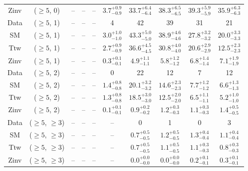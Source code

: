 \begin{table}[h!]
{\begin{tabular}{cccccccccc}
	Zinv & ($\ge5$, 0) & -- & -- & -- & $3.7^{+ 0.9 }_{- 0.9 }$ & $33.7^{+ 6.4 }_{- 6.4 }$ & $38.3^{+ 6.5 }_{- 6.5 }$ & $39.3^{+ 5.9 }_{- 5.9 }$ & $35.9^{+ 6.3 }_{- 6.3 }$ \\[0.5ex] 
	Data & ($\ge5$, 1) & -- & -- & -- & 4 & 42 & 39 & 31 & 21 \\[0.5ex] 
	SM & ($\ge5$, 1) & -- & -- & -- & $3.0^{+ 1.0 }_{- 1.0 }$ & $43.3^{+ 5.0 }_{- 5.0 }$ & $38.9^{+ 4.6 }_{- 4.6 }$ & $27.8^{+ 3.2 }_{- 3.2 }$ & $20.0^{+ 3.3 }_{- 3.3 }$ \\[0.5ex] 
	Ttw & ($\ge5$, 1) & -- & -- & -- & $2.7^{+ 0.9 }_{- 0.9 }$ & $36.6^{+ 4.5 }_{- 4.5 }$ & $30.8^{+ 4.0 }_{- 4.0 }$ & $20.6^{+ 2.9 }_{- 2.9 }$ & $12.5^{+ 2.3 }_{- 2.3 }$ \\[0.5ex] 
	Zinv & ($\ge5$, 1) & -- & -- & -- & $0.3^{+ 0.1 }_{- 0.1 }$ & $4.9^{+ 1.1 }_{- 1.1 }$ & $5.8^{+ 1.2 }_{- 1.2 }$ & $6.8^{+ 1.4 }_{- 1.4 }$ & $7.1^{+ 1.9 }_{- 1.9 }$ \\[0.5ex] 
	Data & ($\ge5$, 2) & -- & -- & -- & 0 & 22 & 12 & 7 & 12 \\[0.5ex] 
	SM & ($\ge5$, 2) & -- & -- & -- & $1.4^{+ 0.8 }_{- 0.8 }$ & $20.1^{+ 3.2 }_{- 3.2 }$ & $14.6^{+ 2.3 }_{- 2.3 }$ & $7.7^{+ 1.2 }_{- 1.2 }$ & $6.6^{+ 1.3 }_{- 1.3 }$ \\[0.5ex] 
	Ttw & ($\ge5$, 2) & -- & -- & -- & $1.3^{+ 0.8 }_{- 0.8 }$ & $18.5^{+ 3.0 }_{- 3.0 }$ & $12.5^{+ 2.0 }_{- 2.0 }$ & $6.5^{+ 1.1 }_{- 1.1 }$ & $5.2^{+ 1.0 }_{- 1.0 }$ \\[0.5ex] 
	Zinv & ($\ge5$, 2) & -- & -- & -- & $0.1^{+ 0.1 }_{- 0.1 }$ & $0.9^{+ 0.2 }_{- 0.2 }$ & $1.2^{+ 0.3 }_{- 0.3 }$ & $1.1^{+ 0.3 }_{- 0.3 }$ & $1.4^{+ 0.5 }_{- 0.5 }$ \\[0.5ex] 
	Data & ($\ge5$, $\ge3$) & -- & -- & -- & -- & 0 & 1 & 0 & 3 \\[0.5ex] 
	SM & ($\ge5$, $\ge3$) & -- & -- & -- & -- & $0.7^{+ 0.5 }_{- 0.5 }$ & $1.2^{+ 0.5 }_{- 0.5 }$ & $1.3^{+ 0.4 }_{- 0.4 }$ & $1.1^{+ 0.4 }_{- 0.4 }$ \\[0.5ex] 
	Ttw & ($\ge5$, $\ge3$) & -- & -- & -- & -- & $0.7^{+ 0.5 }_{- 0.5 }$ & $1.1^{+ 0.5 }_{- 0.5 }$ & $1.1^{+ 0.3 }_{- 0.3 }$ & $0.8^{+ 0.3 }_{- 0.3 }$ \\[0.5ex] 
	Zinv & ($\ge5$, $\ge3$) & -- & -- & -- & -- & $0.0^{+ 0.0 }_{- 0.0 }$ & $0.0^{+ 0.0 }_{- 0.0 }$ & $0.2^{+ 0.1 }_{- 0.1 }$ & $0.3^{+ 0.1 }_{- 0.1 }$ \\[0.5ex] 
	\hline
	\hline
\end{tabular}}
\end{table}
